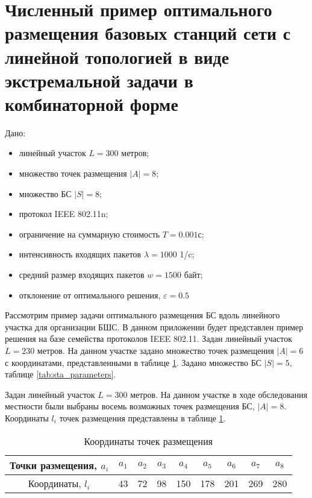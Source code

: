 \fixme{=================================================}
\section{Численный пример оптимального размещения базовых станций сети с линейной топологией в виде экстремальной задачи в комбинаторной форме}\label{part4:bnb_solution}



Дано:
\begin{itemize}
  \item линейный участок $L =300$ метров;
  \item множество точек размещения $|A| =8$;
  \item множество БС $|S| =8$;
  \item протокол IEEE 802.11n;
  \item ограничение на суммарную стоимость $T =0.001$с;
  \item интенсивность входящих пакетов $\lambda = 1000$ 1/c;
  \item средний размер входящих пакетов $w = 1500$ байт;
  \item отклонение от оптимального решения, $\varepsilon=0.5$%
\end{itemize}

Рассмотрим пример задачи оптимального размещения БС вдоль линейного участка для организации БШС. В данном приложении будет представлен пример решения на базе семейства протоколов IEEE 802.11. Задан линейный участок $L =230$ метров. На данном участке задано множество точек размещения  $|A| =6$ с координатами, представленными в таблице \cref{tab:placement_point}. Задано множество БС $|S| =5$, таблице \cref{tab:sta_parameters}. 




Задан линейный участок $L =300$ метров. На данном участке в ходе обследования местности были выбраны восемь возможных точек размещения БС, $|A| =8$. Координаты $l_i$ точек размещения представлены в таблице \cref{tab:placement_point}.

\begin{table}[h!]\centering
  \begin{tabular}{|c||c|c|c|c|c|c|c|c|}\hline
      
      Точки размещения, $a_i$ &	$a_1$&	$a_2$&	$a_3$&	$a_4$&	$a_5$&	$a_6$&	$a_7$& $a_8$ \\
      \hline
      Координаты, $l_i$ &	43&	72&	98&	150&	178&	201&	269&	280\\
      \hline

\end{tabular}\caption{Координаты точек размещения}\label{tab:placement_point}
\end{table}

